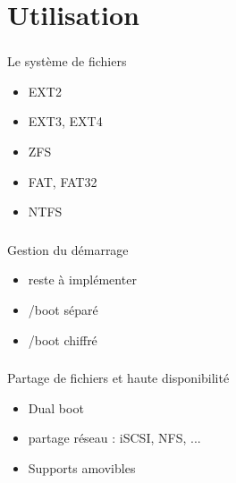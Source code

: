 \section{Utilisation}

\begin{frame}
	\frametitle{\insertsectionhead}
	\begin{block}{Le système de fichiers}
		\begin{itemize}
			\item EXT2
			\item EXT3, EXT4
			\item ZFS
			\item FAT, FAT32
			\item NTFS
		\end{itemize}
	\end{block}
\end{frame}

\begin{frame}
	\frametitle{\insertsectionhead}
	\begin{block}{Gestion du démarrage}
		\begin{itemize}
			\item reste à implémenter
			\item /boot séparé
			\item /boot chiffré
		\end{itemize}
	\end{block}
\end{frame}

\begin{frame}
	\frametitle{\insertsectionhead}
	\begin{block}{Partage de fichiers et haute disponibilité}
		\begin{itemize}
			\item Dual boot
			\item partage réseau : iSCSI, NFS, ...
			\item Supports amovibles
		\end{itemize}
	\end{block}
\end{frame}

